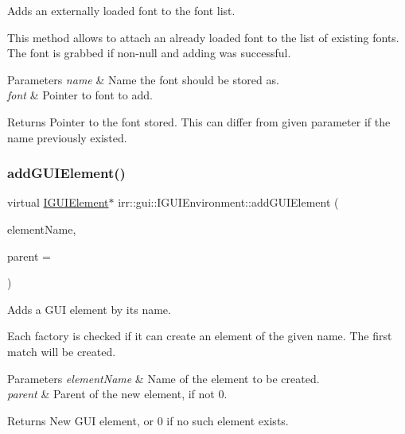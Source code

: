 Adds an externally loaded font to the font list. 

This method allows to attach an already loaded font to the list of existing fonts. The font is grabbed if non-\/null and adding was successful. 
\begin{DoxyParams}{Parameters}
{\em name} & Name the font should be stored as. \\
\hline
{\em font} & Pointer to font to add. \\
\hline
\end{DoxyParams}
\begin{DoxyReturn}{Returns}
Pointer to the font stored. This can differ from given parameter if the name previously existed. 
\end{DoxyReturn}
\mbox{\label{classirr_1_1gui_1_1IGUIEnvironment_a17114e35fc67f6d54df1baebb806f3b7}} 
\subsubsection{\texorpdfstring{add\+G\+U\+I\+Element()}{addGUIElement()}}
{\footnotesize\ttfamily virtual \hyperlink{classirr_1_1gui_1_1IGUIElement}{I\+G\+U\+I\+Element}$\ast$ irr\+::gui\+::\+I\+G\+U\+I\+Environment\+::add\+G\+U\+I\+Element (\begin{DoxyParamCaption}\item[{const \hyperlink{namespaceirr_a9395eaea339bcb546b319e9c96bf7410}{c8} $\ast$}]{element\+Name,  }\item[{\hyperlink{classirr_1_1gui_1_1IGUIElement}{I\+G\+U\+I\+Element} $\ast$}]{parent = {} }\end{DoxyParamCaption})\hspace{0.3cm}{\ttfamily [pure virtual]}}



Adds a G\+UI element by its name. 

Each factory is checked if it can create an element of the given name. The first match will be created. 
\begin{DoxyParams}{Parameters}
{\em element\+Name} & Name of the element to be created. \\
\hline
{\em parent} & Parent of the new element, if not 0. \\
\hline
\end{DoxyParams}
\begin{DoxyReturn}{Returns}
New G\+UI element, or 0 if no such element exists. 
\end{DoxyReturn}
\mbox{\label{classirr_1_1gui_1_1IGUIEnvironment_a35cc257b3a183551a2ed0376dcec9fe4}} 
